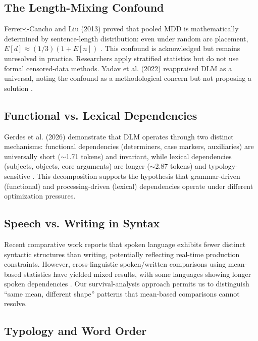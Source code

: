 \documentclass[11pt,letterpaper]{article}
\begin{document}
\subsection{The Length-Mixing Confound}

Ferrer-i-Cancho and Liu (2013) proved that pooled MDD is mathematically determined by sentence-length distribution: even under random arc placement, $E[d] \approx (1/3)(1+E[n])$ \citep{FerreriCancho2013}. This confound is acknowledged but remains unresolved in practice. Researchers apply stratified statistics but do not use formal censored-data methods. Yadav et al. (2022) reappraised DLM as a universal, noting the confound as a methodological concern but not proposing a solution \citep{Yadav2022}.

\subsection{Functional vs. Lexical Dependencies}

Gerdes et al. (2026) demonstrate that DLM operates through two distinct mechanisms: functional dependencies (determiners, case markers, auxiliaries) are universally short ($\sim$1.71 tokens) and invariant, while lexical dependencies (subjects, objects, core arguments) are longer ($\sim$2.87 tokens) and typology-sensitive \citep{Gerdes2026}. This decomposition supports the hypothesis that grammar-driven (functional) and processing-driven (lexical) dependencies operate under different optimization pressures.

\subsection{Speech vs. Writing in Syntax}

Recent comparative work reports that spoken language exhibits fewer distinct syntactic structures than writing, potentially reflecting real-time production constraints. However, cross-linguistic spoken/written comparisons using mean-based statistics have yielded mixed results, with some languages showing longer spoken dependencies \citep{Jaeger2010}. Our survival-analysis approach permits us to distinguish ``same mean, different shape'' patterns that mean-based comparisons cannot resolve.

\subsection{Typology and Word Order}
\end{document}
